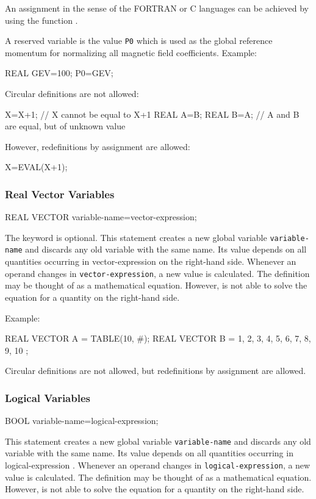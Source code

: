 An assignment in the sense of the FORTRAN or C languages can be achieved
by using the  function .

A reserved variable is the value \texttt{P0} which is used as the
global reference momentum for normalizing all magnetic field coefficients.
\noindent Example:
\begin{example}
REAL GEV=100;
P0=GEV;
\end{example}
Circular definitions are not allowed:
\begin{example}
X=X+1;    // X cannot be equal to X+1
REAL A=B;
REAL B=A;      // A and B are equal, but of unknown value
\end{example}
However, redefinitions by assignment are allowed:
\begin{example}
X=EVAL(X+1);
\end{example}

\subsubsection{Real Vector Variables}
\begin{example}
REAL VECTOR variable-name=vector-expression;
\end{example}
The keyword  is optional.
This statement creates a new global variable \texttt{variable-name}
and discards any old variable with the same name.
Its value depends on all quantities occurring
in {vector-expression}  on the right-hand side.
Whenever an operand changes in \texttt{vector-expression},
a new value is calculated.
The definition may be thought of as a mathematical equation.
However, \opal is not able to solve the equation for a quantity on the
right-hand side.

\noindent Example:
\begin{example}
REAL VECTOR A = TABLE(10, #);
REAL VECTOR B = { 1, 2, 3, 4, 5, 6, 7, 8, 9, 10 };
\end{example}
Circular definitions are not allowed, but redefinitions by assignment
are allowed.

\subsubsection{Logical Variables}
\begin{example}
BOOL variable-name=logical-expression;
\end{example}
This statement creates a new global variable \texttt{variable-name}
and discards any old variable with the same name.
Its value depends on all quantities occurring
in {logical-expression} .
Whenever an operand changes in \texttt{logical-expression},
a new value is calculated.
The definition may be thought of as a mathematical equation.
However, \opal is not able to solve the equation for a quantity on the
right-hand side.

